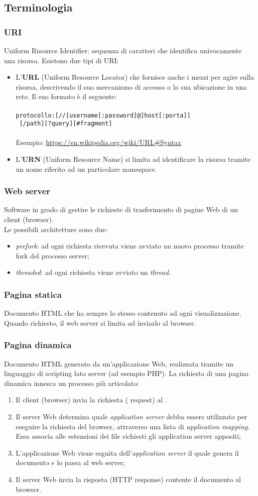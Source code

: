 \documentclass[a4paper,11pt]{article}
\def\code#1{\texttt{#1}}
\def\subsub#1{\subsubsection{#1}\label{#1}}
\def\vedi#1{\nameref{#1}}
\def\italic#1{\textit{#1}}
\begin{document}
\subsection{Terminologia} 
\subsub{URI} Uniform Risource Identifier: sequenza di caratteri che identifica univocamente una risorsa. Esistono due tipi di URI:
\begin{itemize}
\item L'\textbf{URL} (Uniform Resource Locator) che fornisce anche i mezzi per agire sulla risorsa, descrivendo il suo meccanismo di accesso o la sua ubicazione in una rete. Il suo formato è il seguente:\\\ \\ \code{protocollo:[//[username[:password]@]host[:porta]]\\ \ [/path][?query][\#fragment]}
\\\ \\
Esempio: \url{https://en.wikipedia.org/wiki/URL#Syntax}
\item L'\textbf{URN} (Uniform Resource Name) si limita ad identificare la risorsa tramite un nome riferito ad un particolare namespace.
\end{itemize}
\subsub{Web server}
Software in grado di gestire le richieste di trasferimento di pagine Web di un client (browser).\\ Le possibili architetture sono due:
\begin{itemize}
\item \italic{prefork}: ad ogni richiesta ricevuta viene avviato un nuovo processo tramite fork del processo server;
\item \italic{threaded}: ad ogni richiesta viene avviato un \italic{thread}.
\end{itemize}
\subsub{Pagina statica}
Documento HTML che ha sempre lo stesso contenuto ad ogni visualizzazione. Quando richiesto, il web server si limita ad inviarlo al browser.
\subsub{Pagina dinamica}
Documento HTML generato da un'applicazione Web, realizzata tramite un linguaggio di scripting lato server (ad esempio PHP). La richiesta di una pagina dinamica innesca un processo più articolato:\ 
\begin{enumerate}
\item Il client (browser) invia la richiesta (\vedi{HTTP} request) al \vedi{Web server}.
\item Il server Web determina quale \textit{application server} debba essere utilizzato per eseguire la richiesta del browser, attraverso una lista di \italic{application mapping}. Essa associa alle estensioni dei file richiesti gli  application server appositi;
\item L'applicazione Web viene esguita dell'\italic{application server} il quale genera il documento e lo passa al web server;
\item Il server Web invia la risposta (HTTP response) contente il documento al browser.
\end{enumerate}
\end{document}
